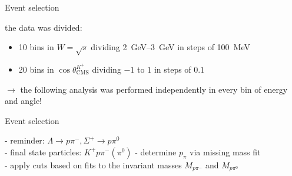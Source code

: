 \documentclass[11pt,aspectratio=1610,dvipsnames]{beamer}
\begin{document}
\begin{frame}{Event selection}
	\begin{tcolorbox}[colback=black!10,colframe=gray!20!black,title=Binning of data] 
	the data was divided:
	\begin{itemize}
		\item 10 bins in $W=\sqrt{s}$ dividing \SIrange{2}{3}{\giga\eV} in steps of \SI{100}{\mega\eV}
		\item 20 bins in $\cos\theta_\text{CMS}^{K^+}$ dividing $-1$ to $1$ in steps of $0.1$
	\end{itemize}
\end{tcolorbox}
$\to$ the following analysis was performed independently in every bin of energy and angle!
\end{frame}
\begin{frame}{Event selection}
	\centering
	\begin{minipage}{.49\linewidth}
		\begin{tcolorbox}[colback=black!10,colframe=gray!20!black,title=extracting $\Lambda\pi^0$ and $\Sigma^+\pi^-$] 
		- reminder: $\Lambda\to p\pi^-, \Sigma^+\to p\pi^0$\\	
		- final state particles: $K^+p\pi^-(\pi^0)$ 
		- determine $p_\pi$ via missing mass fit\\
		- apply cuts based on fits to the invariant masses $M_{p\pi^-}$ and $M_{p\pi^0}$	
			

\end{tcolorbox}
\end{minipage}
\end{frame}
\end{document}
